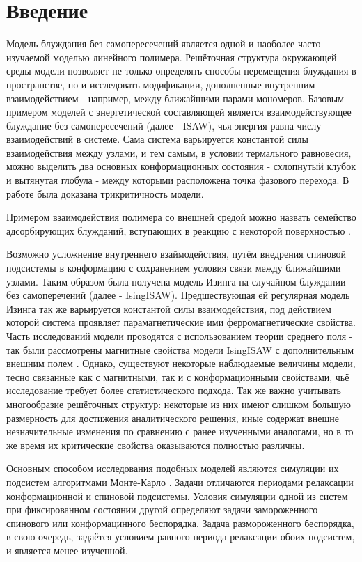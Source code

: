 \section{Введение}

\setcounter{page}{1}

Модель блуждания без самопересечений является одной и наоболее часто изучаемой моделью линейного полимера. 
Решёточная структура окружающей среды модели позволяет не только определять способы перемещения блуждания в пространстве, но и исследовать модификации, дополненные внутренним взаимодействием - например, между ближайшими парами мономеров.
Базовым примером моделей с энергетической составляющей является взаимодействующее блуждание без самопересечений (далее - ISAW), чья энергия равна числу взаимодействий в системе.
Сама система варьируется константой силы взаимодействия между узлами, и тем самым, в условии термального равновесия, можно выделить два основных конформационных состояния - схлопнутый клубок и вытянутая глобула - между которыми расположена точка фазового перехода.
В работе \cite{Gennes1979} была доказана трикритичность модели.

Примером взаимодействия полимера со внешней средой можно назвать семейство адсорбирующих блужданий, 
вступающих в реакцию с некоторой поверхностью \cite{LivneSAW1988}.

Возможно усложнение внутреннего взаймодействия, путём внедрения спиновой подсистемы в конформацию 
с сохранением условия связи между ближайшими узлами.
Таким образом была получена модель Изинга на случайном блуждании без самоперечений (далее - IsingISAW).
Предшествующая ей регулярная модель Изинга так же варьируется константой силы взаимодействия, под действием которой система проявляет парамагнетические ими ферромагнетические свойства.
Часть исследований модели проводятся с использованием теории среднего поля - так были рассмотрены магнитные свойства модели IsingISAW с дополнительным внешним полем \cite{Garel1999}. 
Однако, существуют некоторые наблюдаемые величины модели, тесно связанные как с магнитными, так и с конформационными свойствами, чьё исследование требует более статистического подхода.
Так же важно учитывать многообразие решёточных структур: некоторые из них имеют слишком большую размерность для достижения аналитического решения, 
иные содержат внешне незначительные изменения по сравнению с ранее изученными аналогами, 
но в то же время их критические свойства оказываются полностью различны.

Основным способом исследования подобных моделей являются симуляции их подсистем алгоритмами Монте-Карло \cite{Worm, Wolff, madras1988pivot}.
Задачи отличаются периодами релаксации конформационной и спиновой подсистемы.
Условия симуляции одной из систем при фиксированном состоянии другой определяют задачи замороженного спинового или конформацинного беспорядка.
Задача размороженного беспорядка, в свою очередь, задаётся условием равного периода релаксации обоих подсистем, и является менее изученной.

